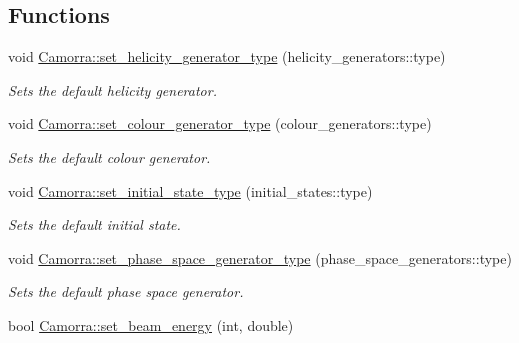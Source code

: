 \subsection*{Functions}
\begin{DoxyCompactItemize}
\item 
\hypertarget{a00800_a434afc4df475b015efdcf5a266c2698e}{
void \hyperlink{a00800_a434afc4df475b015efdcf5a266c2698e}{Camorra::set\_\-helicity\_\-generator\_\-type} (helicity\_\-generators::type)}
\label{a00800_a434afc4df475b015efdcf5a266c2698e}

\begin{DoxyCompactList}\small\item\em Sets the default helicity generator. \end{DoxyCompactList}\item 
\hypertarget{a00800_ad71a6538e255e41a537f0e34740f51ac}{
void \hyperlink{a00800_ad71a6538e255e41a537f0e34740f51ac}{Camorra::set\_\-colour\_\-generator\_\-type} (colour\_\-generators::type)}
\label{a00800_ad71a6538e255e41a537f0e34740f51ac}

\begin{DoxyCompactList}\small\item\em Sets the default colour generator. \end{DoxyCompactList}\item 
\hypertarget{a00800_ae4e428854913f1ce28404e339ba590e8}{
void \hyperlink{a00800_ae4e428854913f1ce28404e339ba590e8}{Camorra::set\_\-initial\_\-state\_\-type} (initial\_\-states::type)}
\label{a00800_ae4e428854913f1ce28404e339ba590e8}

\begin{DoxyCompactList}\small\item\em Sets the default initial state. \end{DoxyCompactList}\item 
\hypertarget{a00800_ad8899b9b08426e00640888dffbcefbb1}{
void \hyperlink{a00800_ad8899b9b08426e00640888dffbcefbb1}{Camorra::set\_\-phase\_\-space\_\-generator\_\-type} (phase\_\-space\_\-generators::type)}
\label{a00800_ad8899b9b08426e00640888dffbcefbb1}

\begin{DoxyCompactList}\small\item\em Sets the default phase space generator. \end{DoxyCompactList}\item 
\hypertarget{a00800_ae560fbf687bfc8cf484439ccccaaeffb}{
bool \hyperlink{a00800_ae560fbf687bfc8cf484439ccccaaeffb}{Camorra::set\_\-beam\_\-energy} (int, double)}
\label{a00800_ae560fbf687bfc8cf484439ccccaaeffb}


\end{DoxyCompactItemize}
